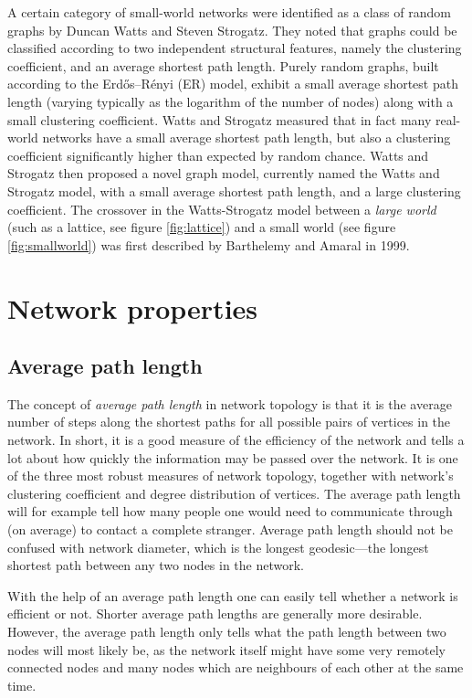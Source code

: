     A certain category of small-world networks were identified as a class of random graphs by Duncan Watts and Steven Strogatz\cite{WattsStrogatz1998}. They noted that graphs could be classified according to two independent structural features, namely the clustering coefficient, and an average shortest path length. Purely random graphs, built according to the Erdős–Rényi (ER) model, exhibit a small average shortest path length (varying typically as the logarithm of the number of nodes) along with a small clustering coefficient\cite{ErdosRenyi1960}. Watts and Strogatz measured that in fact many real-world networks have a small average shortest path length, but also a clustering coefficient significantly higher than expected by random chance. Watts and Strogatz then proposed a novel graph model, currently named the Watts and Strogatz model, with a small average shortest path length, and a large clustering coefficient. The crossover in the Watts-Strogatz model between a \emph{large world} (such as a lattice, see figure \ref{fig:lattice}) and a small world (see figure \ref{fig:smallworld}) was first described by Barthelemy and Amaral in 1999\cite{BarthelemyAmaral1999}.
    
  \section{Network properties}
  
    \subsection{Average path length}
    
      The concept of \emph{average path length} in network topology is that it is the average number of steps along the shortest paths for all possible pairs of vertices in the network. In short, it is a good measure of the efficiency of the network and tells a lot about how quickly the information may be passed over the network. It is one of the three most robust measures of network topology, together with network's clustering coefficient and degree distribution of vertices. The average path length will for example tell how many people one would need to communicate through (on average) to contact a complete stranger. Average path length should not be confused with network diameter, which is the longest geodesic---the longest shortest path between any two nodes in the network.

      With the help of an average path length one can easily tell whether a network is efficient or not. Shorter average path lengths are generally more desirable. However, the average path length only tells what the path length between two nodes will most likely be, as the network itself might have some very remotely connected nodes and many nodes which are neighbours of each other at the same time.
      
